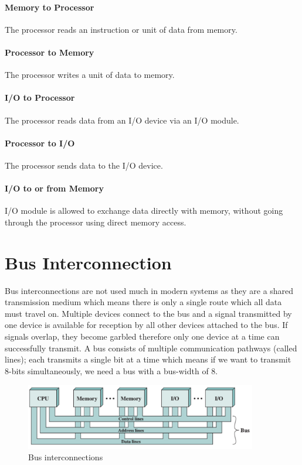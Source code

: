 \paragraph*{Memory to Processor} The processor reads an instruction or unit of data from memory.
\paragraph*{Processor to Memory} The processor writes a unit of data to memory.
\paragraph*{I/O to Processor} The processor reads data from an I/O device via an I/O module.
\paragraph*{Processor to I/O} The processor sends data to the I/O device.
\paragraph*{I/O to or from Memory} I/O module is allowed to exchange data directly with memory, without going through the processor using direct memory access.

\section*{Bus Interconnection}
Bus interconnections are not used much in modern systems as they are a shared transmission medium which means there is only a single route which all data must travel on. Multiple devices connect to the bus and a signal transmitted by one device is available for reception by all other devices attached to the bus. If signals overlap, they become garbled therefore only one device at a time can successfully transmit. A bus consists of multiple communication pathways (called lines); each transmits a single bit at a time which means if we want to transmit 8-bits simultaneously, we need a bus with a bus-width of 8. 
\begin{figure}[H]
    \centering
    \includegraphics[width=0.9\textwidth]{assets/bus-interconnection.png} 
    \caption*{Bus interconnections}
\end{figure}
